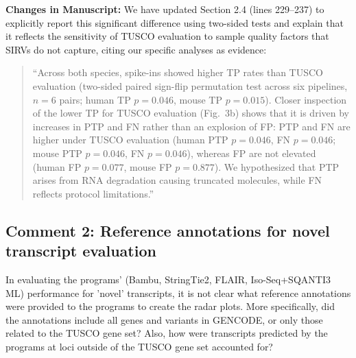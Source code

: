 \documentclass[11pt]{article}
\newcommand{\tuscoEvaluation}{TUSCO evaluation}
\begin{document}
\begin{responseboxnew}
\vspace{0.3cm}
\textbf{Changes in Manuscript:} We have updated Section 2.4 (lines 229--237) to explicitly report this significant difference using two-sided tests and explain that it reflects the sensitivity of TUSCO evaluation to sample quality factors that SIRVs do not capture, citing our specific analyses as evidence:
\begin{quote}
``Across both species, spike-ins showed higher TP rates than \tuscoEvaluation{} (two-sided paired sign-flip permutation test across six pipelines, $n=6$ pairs; human TP $p=0.046$, mouse TP $p=0.015$). Closer inspection of the lower TP for \tuscoEvaluation{} (Fig.~3b) shows that it is driven by increases in PTP and FN rather than an explosion of FP: PTP and FN are higher under \tuscoEvaluation{} (human PTP $p=0.046$, FN $p=0.046$; mouse PTP $p=0.046$, FN $p=0.046$), whereas FP are not elevated (human FP $p=0.077$, mouse FP $p=0.877$). We hypothesized that PTP arises from RNA degradation causing truncated molecules, while FN reflects protocol limitations.''
\end{quote}
\end{responseboxnew}

\subsection{Comment 2: Reference annotations for novel transcript evaluation}

\begin{reviewercomment}
In evaluating the programs' (Bambu, StringTie2, FLAIR, Iso-Seq+SQANTI3 ML) performance for 'novel' transcripts, it is not clear what reference annotations were provided to the programs to create the radar plots. More specifically, did the annotations include all genes and variants in GENCODE, or only those related to the TUSCO gene set? Also, how were transcripts predicted by the programs at loci outside of the TUSCO gene set accounted for?
\end{reviewercomment}
\end{document}
